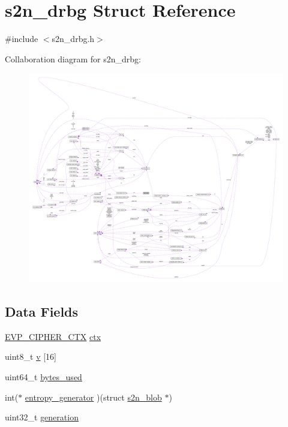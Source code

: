 \hypertarget{structs2n__drbg}{}\section{s2n\+\_\+drbg Struct Reference}
\label{structs2n__drbg}


{\ttfamily \#include $<$s2n\+\_\+drbg.\+h$>$}



Collaboration diagram for s2n\+\_\+drbg\+:\nopagebreak
\begin{figure}[H]
\begin{center}
\leavevmode
\includegraphics[width=350pt]{structs2n__drbg__coll__graph}
\end{center}
\end{figure}
\subsection*{Data Fields}
\begin{DoxyCompactItemize}
\item 
\hyperlink{crypto_2ossl__typ_8h_aab2bd6a044e1d31ebc2fe82b3b0b3d9a}{E\+V\+P\+\_\+\+C\+I\+P\+H\+E\+R\+\_\+\+C\+TX} \hyperlink{structs2n__drbg_a2495707d38554dedf142a99b04a278f8}{ctx}
\item 
uint8\+\_\+t \hyperlink{structs2n__drbg_a8fb0f890ca029f9724fc198f115c05f3}{v} \mbox{[}16\mbox{]}
\item 
uint64\+\_\+t \hyperlink{structs2n__drbg_a7c90d12780b79aa1cf6b15efa0c03106}{bytes\+\_\+used}
\item 
int($\ast$ \hyperlink{structs2n__drbg_a1da47f15436224ab1f799cf4869471e2}{entropy\+\_\+generator} )(struct \hyperlink{structs2n__blob}{s2n\+\_\+blob} $\ast$)
\item 
uint32\+\_\+t \hyperlink{structs2n__drbg_a240945185669680bcfcd13289bd5376a}{generation}
\end{DoxyCompactItemize}


